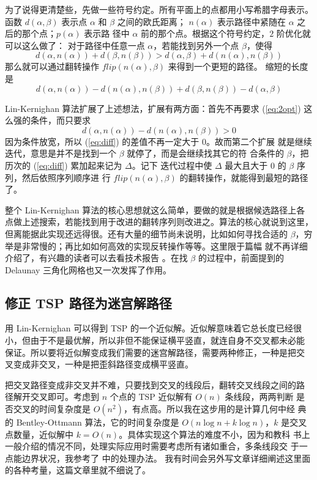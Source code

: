 \documentclass[cs4size,a4paper,adobefonts]{ctexart}
\begin{document}
为了说得更清楚些，先做一些符号约定。所有平面上的点都用小写希腊字母表示。
函数 $d(\alpha,\beta)$ 表示点 $\alpha$ 和 $\beta$ 之间的欧氏距离；
$n(\alpha)$ 表示路径中紧随在 $\alpha$ 之后的那个点；$p(\alpha)$ 表示路
径中 $\alpha$ 前的那个点。根据这个符号约定，$2$ 阶优化就可以这么做了：
对于路径中任意一点 $\alpha$，若能找到另外一个点 $\beta$，使得
\begin{equation}\label{eq:2opt}
  d(\alpha,n(\alpha)) + d(\beta, n(\beta)) > d(\alpha, \beta) +
  d(n(\alpha), n(\beta))
\end{equation}
那么就可以通过翻转操作 $flip(n(\alpha), \beta)$ 来得到一个更短的路径。
缩短的长度是
\begin{equation}\label{eq:diff}
  d(\alpha,n(\alpha)) - d(n(\alpha), n(\beta)) + d(\beta, n(\beta)) -
  d(\alpha, \beta)
\end{equation}

Lin-Kernighan 算法扩展了上述想法，扩展有两方面：首先不再要求
(\ref{eq:2opt}) 这么强的条件，而只要求
\begin{equation}
  d(\alpha,n(\alpha)) - d(n(\alpha), n(\beta)) > 0
\end{equation}
因为条件放宽，所以 (\ref{eq:diff}) 的差值不再一定大于 0。故而第二个扩展
就是继续迭代，意思是并不是找到一个 $\beta$ 就停了，而是会继续找其它的符
合条件的 $\beta$，把历次的 (\ref{eq:diff}) 累加起来记为 $\Delta$。记下
迭代过程中使 $\Delta$ 最大且大于 0 的 $\beta$ 序列，然后依照序列顺序进
行 $flip(n(\alpha), \beta)$ 的翻转操作，就能得到最短的路径了。

整个 Lin-Kernighan 算法的核心思想就这么简单，要做的就是根据候选路径上各
点做上述搜索，若能找到用于改进的翻转序列则改进之。算法的核心就说到这里，
但离能据此实现还远得很。还有大量的细节尚未说明，比如如何寻找合适的
$\beta$，穷举是非常慢的；再比如如何高效的实现反转操作等等。这里限于篇幅
就不再详细介绍了，有兴趣的读者可以去看技术报告 \cite{1999finding}。在找
$\beta$ 的过程中，前面提到的 Delaunay 三角化网格也又一次发挥了作用。

\subsection{修正 TSP 路径为迷宫解路径}
用 Lin-Kernighan 可以得到 TSP 的一个近似解。近似解意味着它总长度已经很
小，但由于不是最优解，所以非但不能保证横平竖直，就连自身不交叉都未必能
保证。所以要将近似解变成我们需要的迷宫解路径，需要两种修正，一种是把交
叉变成非交叉，一种是把歪斜路径变成横平竖直。

把交叉路径变成非交叉并不难，只要找到交叉的线段后，翻转交叉线段之间的路
径解开交叉即可。考虑到 $n$ 个点的 TSP 近似解有 $O(n)$ 条线段，两两判断
是否交叉的时间复杂度是 $O(n^2)$，有点高。所以我在这步用的是计算几何中经
典的 Bentley-Ottmann 算法，它的时间复杂度是 $O(n\log n+k\log n)$，$k$
是交叉点数量，近似解中 $k=O(n)$。具体实现这个算法的难度不小，因为和教科
书上一般介绍的情况不同，处理实际应用时需要考虑所有诸如重合，多条线段交
于一点能边界状况，我参考了 \cite{Berg:2008:CGA:1370949} 中的处理办法。
我有时间会另外写文章详细阐述这里面的各种考量，这篇文章里就不细说了。
\end{document}
